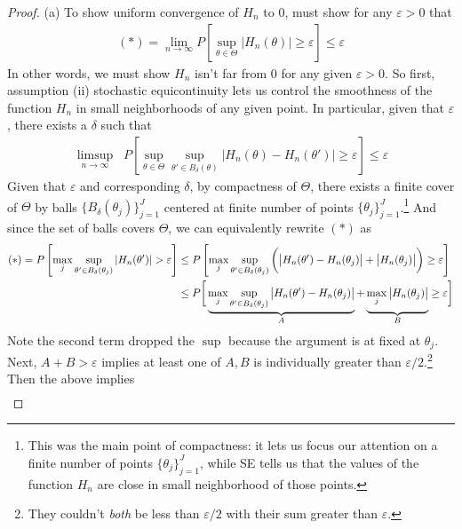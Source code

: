 \documentclass[12pt]{article}
\theoremstyle{plain}
\theoremstyle{definition}
\theoremstyle{remark}
\newcommand{\ra}{\rightarrow}
\newcommand{\limn}{\lim_{n\rightarrow\infty}}
\begin{document}
\begin{proof}
(a)
To show uniform convergence of $H_n$ to $0$, must show for any
$\varepsilon>0$ that
\begin{align}
  (*)
  =
  \limn
  P\left[
  \sup_{\theta\in\Theta}
  |H_n(\theta)|\geq\varepsilon
  \right]
  \leq \varepsilon
  \label{Pse}
\end{align}
In other words, we must show $H_n$ isn't far from $0$ for any given
$\varepsilon>0$.
So first, assumption (ii) stochastic equicontinuity lets us control the
smoothness of the function $H_n$ in small neighborhoods of any given
point. In particular, given that $\varepsilon$, there exists a $\delta$
such that
\begin{align}
  \limsup_{n\ra\infty}\;\;
  P\left[
    \sup_{\theta\in\Theta}
    \sup_{\theta'\in B_\delta(\theta)}
    |H_n(\theta)-H_n(\theta')|
    \geq
    \varepsilon
  \right]
  \leq \varepsilon
\end{align}
Given that $\varepsilon$ and corresponding $\delta$, by compactness of
$\Theta$, there exists a finite cover of $\Theta$ by balls
$\{B_\delta(\theta_j)\}_{j=1}^J$ centered at finite number of points
$\{\theta_j\}_{j=1}^J$.\footnote{%
  This was the main point of compactness: it lets us focus our attention
  on a finite number of points $\{\theta_j\}_{j=1}^J$, while SE tells us
  that the values of the function $H_n$ are close in small neighborhood
  of those points.
}
And since the set of balls covers $\Theta$, we can equivalently rewrite
$(*)$ as
\begin{align*}
  (*)
  =
  P\left[
  \max_j
  \sup_{\theta'\in B_\delta(\theta_j)}
  |H_n(\theta')|
  >\varepsilon
  \right]
  &\leq
  P\left[
  \max_j
  \sup_{\theta'\in B_\delta(\theta_j)}
  \bigg(
  \big|H_n(\theta')-H_n(\theta_j)\big|
  +
  \big|H_n(\theta_j)\big|
  \bigg)
  \geq\varepsilon
  \right]
  \\
  &\leq
  P\bigg[
  \underbrace{%
    \max_j
    \sup_{\theta'\in B_\delta(\theta_j)}
    \big|H_n(\theta')-H_n(\theta_j)\big|
  }_{A}
  +
  \underbrace{%
    \max_j
    \big|H_n(\theta_j)\big|
    \vphantom{\sup_{\theta'\in B_\delta(\theta_j)}}
  }_{B}
  \geq\varepsilon
  \bigg]
\end{align*}
Note the second term dropped the $\sup$ because the argument is at fixed
at $\theta_j$.
Next, $A+B>\varepsilon$ implies at least one of $A,B$ is
individually greater than $\varepsilon/2$.\footnote{%
  They couldn't \emph{both} be less than $\varepsilon/2$ with their sum
  greater than $\varepsilon$.
}
Then the above implies
\begin{align*}

\end{align*}
\end{proof}
\end{document}
